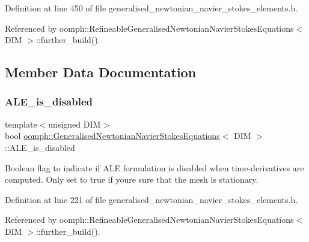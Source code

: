 Definition at line 450 of file generalised\+\_\+newtonian\+\_\+navier\+\_\+stokes\+\_\+elements.\+h.



Referenced by oomph\+::\+Refineable\+Generalised\+Newtonian\+Navier\+Stokes\+Equations$<$ D\+I\+M $>$\+::further\+\_\+build().



\subsection{Member Data Documentation}
\mbox{\label{classoomph_1_1GeneralisedNewtonianNavierStokesEquations_a1a9cdb8ad05d69e91acbe3a7efde2993}} 
\subsubsection{\texorpdfstring{A\+L\+E\+\_\+is\+\_\+disabled}{ALE\_is\_disabled}}
{\footnotesize\ttfamily template$<$unsigned D\+IM$>$ \\
bool \hyperlink{classoomph_1_1GeneralisedNewtonianNavierStokesEquations}{oomph\+::\+Generalised\+Newtonian\+Navier\+Stokes\+Equations}$<$ D\+IM $>$\+::A\+L\+E\+\_\+is\+\_\+disabled\hspace{0.3cm}{\ttfamily [protected]}}



Boolean flag to indicate if A\+LE formulation is disabled when time-\/derivatives are computed. Only set to true if you\textquotesingle{}re sure that the mesh is stationary. 



Definition at line 221 of file generalised\+\_\+newtonian\+\_\+navier\+\_\+stokes\+\_\+elements.\+h.



Referenced by oomph\+::\+Refineable\+Generalised\+Newtonian\+Navier\+Stokes\+Equations$<$ D\+I\+M $>$\+::further\+\_\+build().

\mbox{\label{classoomph_1_1GeneralisedNewtonianNavierStokesEquations_aaa872748d87521afef44a72f5c125774}} 

